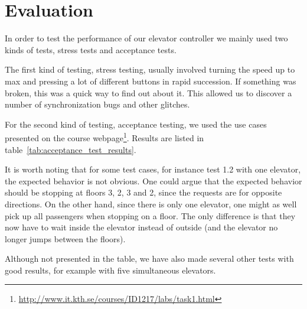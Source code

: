 \documentclass[a4paper]{article}
\begin{document}
\section{Evaluation}

In order to test the performance of our elevator controller we mainly used two
kinds of tests, stress tests and acceptance tests.

The first kind of testing, stress testing, usually involved turning the speed up
to max and pressing a lot of different buttons in rapid succession. If something
was broken, this was a quick way to find out about it. This allowed us to
discover a number of synchronization bugs and other glitches.

For the second kind of testing, acceptance testing, we used the use cases
presented on the course
webpage\footnote{\url{http://www.it.kth.se/courses/ID1217/labs/task1.html}}.
Results are listed in table~\ref{tab:acceptance_test_results}.

It is worth noting that for some test cases, for instance test 1.2 with one
elevator, the expected behavior is not obvious. One could argue that the
expected behavior should be stopping at floors 3, 2, 3 and 2, since the requests
are for opposite directions. On the other hand, since there is only one
elevator, one might as well pick up all passengers when stopping on a floor. The
only difference is that they now have to wait inside the elevator instead of
outside (and the elevator no longer jumps between the floors).

Although not presented in the table, we have also made several other tests with
good results, for example with five simultaneous elevators.
\end{document}
